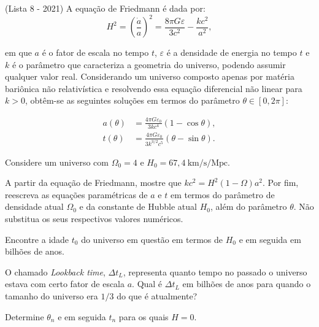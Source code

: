 \documentclass[11pt]{article}
\begin{document}
\begin{pproblem}(Lista 8 - 2021)
    A equação de Friedmann é dada por:
    \begin{equation}
        H^2 = \left( \frac{\dot{a}}{a} \right)^2 = \frac{8\pi G \varepsilon}{3c^2} - \frac{k c^2}{a^2},
    \end{equation}

    em que \(a\) é o fator de escala no tempo \(t\), \(\varepsilon\) é a densidade de energia no tempo \(t\) e \(k\) é o parâmetro que caracteriza a geometria do universo, podendo assumir qualquer valor real. Considerando um universo composto apenas por matéria bariônica não relativística e resolvendo essa equação diferencial não linear para \(k > 0\), obtêm-se as seguintes soluções em termos do parâmetro \(\theta \in [0, 2\pi]\):

    \begin{align}
        a(\theta) &= \frac{4\pi G \varepsilon_0}{3k c^4} \left( 1 - \cos\theta \right), \\
        t(\theta) &= \frac{4\pi G \varepsilon_0}{3k^{3/2}c^5} \left( \theta - \sin\theta \right).
    \end{align}

    Considere um universo com \(\Omega_0 = 4\) e \(H_0 = 67,4 \ \text{km/s/Mpc}\).

    \begin{alternativas}
        \item A partir da equação de Friedmann, mostre que \(k c^2 = H^2 \left( 1 - \Omega \right) a^2\). Por fim, reescreva as equações paramétricas de \(a\) e \(t\) em termos do parâmetro de densidade atual \(\Omega_0\) e da constante de Hubble atual \(H_0\), além do parâmetro \(\theta\). Não substitua os seus respectivos valores numéricos.
        
        \item Encontre a idade \(t_0\) do universo em questão em termos de \(H_0\) e em seguida em bilhões de anos.
        
        \item O chamado \textit{Lookback time}, \(\Delta t_L\), representa quanto tempo no passado o universo estava com certo fator de escala \(a\). Qual é \(\Delta t_L\) em bilhões de anos para quando o tamanho do universo era \(1/3\) do que é atualmente?
        
        \item Determine \(\theta_n\) e em seguida \(t_n\) para os quais \(H = 0\).
    \end{alternativas}


\end{pproblem}
\end{document}
